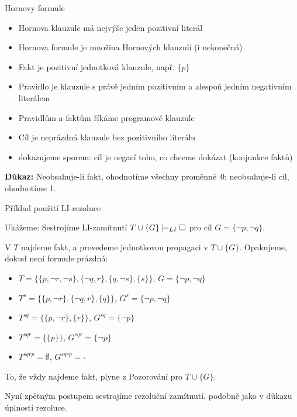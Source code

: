 \documentclass{beamer}
\begin{document}
\begin{frame}{Hornovy formule}
        
    \begin{itemize}
        \item \alert{Hornova klauzule} má nejvýše jeden pozitivní literál
        \item \alert{Hornova formule} je množina Hornových klauzulí (i nekonečná)
        \item \alert{Fakt} je pozitivní jednotková klauzule, např. $\{p\}$
        \item \alert{Pravidlo} je klauzule s právě jedním pozitivním a alespoň jedním negativním literálem
        \item Pravidlům a faktům říkáme \alert{programové klauzule}
        \item \alert{Cíl} je neprázdná klauzule bez pozitivního literálu       
        \item dokazujeme sporem: \alert{cíl} je negací toho, co chceme dokázat (konjunkce faktů)
    \end{itemize}


    \textbf{Důkaz:} Neobsahuje-li fakt, ohodnotíme všechny proměnné~0; neobsahuje-li cíl, ohodnotíme 1.\hfill\qedsymbol

\end{frame}


\begin{frame}{Příklad použití LI-rezoluce}
    
    Ukážeme:  Sestrojíme LI-zamítnutí $T\cup\{G\}\proves_{LI}\square$ pro cíl $G=\{\neg p,\neg q\}$. 
    
    
    V $T$ \alert{najdeme fakt}, a provedeme \alert{jednotkovou propagaci} v $T\cup\{G\}$. Opakujeme, dokud není formule prázdná:
    \begin{itemize}
        \item $T=\{\{p,\neg r,\neg s\},\{\neg q,r\},\{q,\neg s\},\{s\}\}$, $G=\{\neg p,\neg q\}$
        \item $T^s=\{\{p,\neg r\},\{\neg q,r\},\{q\}\}$, $G^s=\{\neg p,\neg q\}$
        \item $T^{sq}=\{\{p,\neg r\},\{r\}\}$, $G^{sq}=\{\neg p\}$
        \item $T^{sqr}=\{\{p\}\}$, $G^{sqr}=\{\neg p\}$
        \item $T^{sqrp}=\emptyset$, $G^{sqrp}=\square$
    \end{itemize}

    To, že vždy najdeme fakt, plyne z Pozorování pro $T\cup\{G\}$.

    Nyní zpětným postupem sestrojíme rezoluční zamítnutí, podobně jako v důkazu úplnosti rezoluce.
    
\end{frame}
\end{document}
